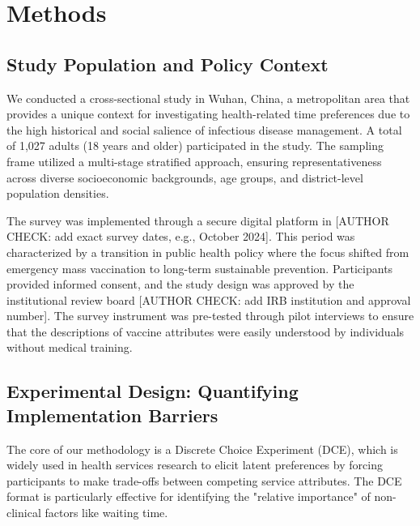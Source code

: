 \documentclass[preprint,12pt,authoryear]{elsarticle}
\begin{document}
\section{Methods}
\subsection{Study Population and Policy Context}
We conducted a cross-sectional study in Wuhan, China, a metropolitan area that provides a unique context for investigating health-related time preferences due to the high historical and social salience of infectious disease management. A total of 1,027 adults (18 years and older) participated in the study. The sampling frame utilized a multi-stage stratified approach, ensuring representativeness across diverse socioeconomic backgrounds, age groups, and district-level population densities.

The survey was implemented through a secure digital platform in [AUTHOR CHECK: add exact survey dates, e.g., October 2024]. This period was characterized by a transition in public health policy where the focus shifted from emergency mass vaccination to long-term sustainable prevention. Participants provided informed consent, and the study design was approved by the institutional review board [AUTHOR CHECK: add IRB institution and approval number]. The survey instrument was pre-tested through pilot interviews to ensure that the descriptions of vaccine attributes were easily understood by individuals without medical training.

\subsection{Experimental Design: Quantifying Implementation Barriers}
The core of our methodology is a Discrete Choice Experiment (DCE), which is widely used in health services research to elicit latent preferences by forcing participants to make trade-offs between competing service attributes. The DCE format is particularly effective for identifying the "relative importance" of non-clinical factors like waiting time.
\end{document}
